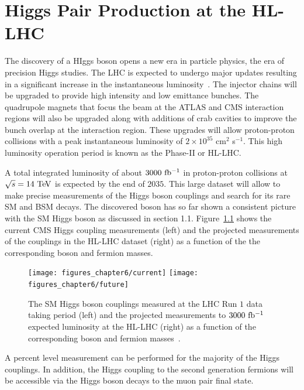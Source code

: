 

\providecommand{\phasezero}{Phase-0 }
\providecommand{\phaseone}{Phase-I }
\providecommand{\phasetwo}{Phase-II }

\chapter{Higgs Pair Production at the HL-LHC}

The discovery of a HIggs boson opens a new era in particle physics, the era of precision Higgs studies. The LHC is expected to undergo major updates resulting in a significant increase in the instantaneous luminosity~\cite{Apollinari:2116337}.  The injector chains will be upgraded to provide high intensity and low emittance bunches. The quadrupole magnets that focus the beam at the ATLAS and CMS interaction regions will also be upgraded along with additions of crab cavities to improve the bunch overlap at the interaction region. These upgrades will allow proton-proton collisions with a peak instantaneous luminosity of $2\times10^{35}$ cm$^2$ s$^{-1}$. This high luminosity operation period is known as the \phasetwo or HL-LHC. 

A total integrated luminosity of about $3000~\mathrm{fb^{-1}}$ in proton-proton collisions at $\sqrt{s}=14~\mathrm{Te\kern -0.1em V}$ is expected by the end of $2035$. This large dataset will allow to make precise measurements of the Higgs boson couplings and search for its rare SM and BSM decays. The discovered boson has so far shown a consistent picture with the SM Higgs boson as discussed in section 1.1. Figure~\ref{fig:coupling} shows the current CMS Higgs coupling measurements (left) and the projected measurements of the couplings in the HL-LHC dataset (right) as a function of the the corresponding boson and fermion masses.      
\begin{figure}[hbtp]
  \begin{center}
    \texttt{[image: figures\_chapter6/current]}
    \texttt{[image: figures\_chapter6/future]}       
    \caption{The SM Higgs boson couplings measured at the LHC Run $1$ data taking period (left) and the projected measurements to $3000~\mathrm{fb^{-1}}$ expected luminosity at the HL-LHC (right) as a function of the corresponding boson and fermion masses~\cite{Butler:2020886}.}
    \label{fig:coupling}
  \end{center}
\end{figure}
A percent level measurement can be performed for the majority of the Higgs couplings. In addition, the Higgs coupling to the second generation fermions will be accessible via the Higgs boson decays to the muon pair final state. 

